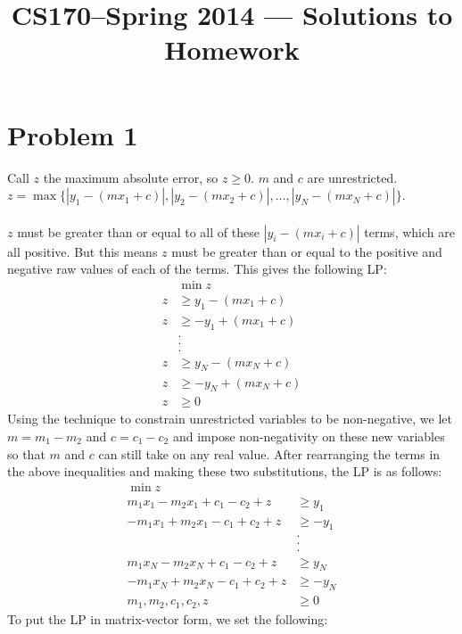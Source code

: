 \documentclass[11pt]{article}
\title{CS170--Spring 2014 --- Solutions to Homework \Homework}
\author{\Name}
\begin{document}
\maketitle
{}
\setcounter{problemnumber}{0}

\section*{Problem 1}
Call $z$ the maximum absolute error, so $z\geq 0$. $m$ and $c$ are unrestricted. \\
$z=\max{\{|y_1-(mx_1+c)|,|y_2-(mx_2+c)|,\ldots,|y_N-(mx_N+c)|\}}$. \\\\
$z$ must be greater than or equal to all of these $|y_i-(mx_i+c)|$ terms, which are all positive. But this means $z$ must be greater than or equal to the positive and negative raw values of each of the terms. This gives the following LP:
\begin{align*}
& \min z \\
z &\geq y_1-(mx_1+c) \\
z &\geq -y_1+(mx_1+c) \\
&. \\ &. \\ &. \\
z &\geq y_N-(mx_N+c) \\
z &\geq -y_N+(mx_N+c) \\
z &\geq 0
\end{align*}
Using the technique to constrain unrestricted variables to be non-negative, we let $m=m_1-m_2$ and $c=c_1-c_2$ and impose non-negativity on these new variables so that $m$ and $c$ can still take on any real value. After rearranging the terms in the above inequalities and making these two substitutions, the LP is as follows:
\begin{align*}
\min z & \\
m_1x_1-m_2x_1+c_1-c_2+z &\geq y_1 \\
-m_1x_1+m_2x_1-c_1+c_2+z &\geq -y_1 \\
&. \\ &. \\ &. \\
m_1x_N-m_2x_N+c_1-c_2+z &\geq y_N \\
-m_1x_N+m_2x_N-c_1+c_2+z &\geq -y_N \\
m_1, m_2, c_1, c_2, z &\geq 0
\end{align*}
To put the LP in matrix-vector form, we set the following:
\end{document}
